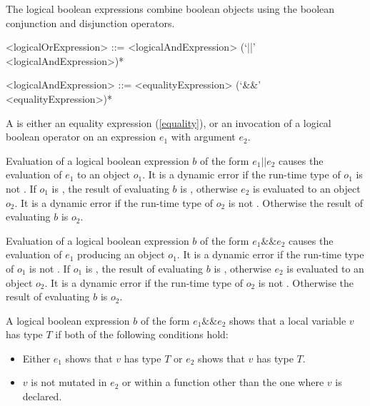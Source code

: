 \documentclass[makeidx]{article}
\begin{document}
{\LMHash{}%
The logical boolean expressions combine boolean objects using
the boolean conjunction and disjunction operators.

\begin{grammar}
<logicalOrExpression> ::= \gnewline{}
  <logicalAndExpression> (`||' <logicalAndExpression>)*

<logicalAndExpression> ::= <equalityExpression> (`\&\&' <equalityExpression>)*
\end{grammar}

\LMHash{}%
A  is either an equality expression
(\ref{equality}),
or an invocation of a logical boolean operator on
an expression $e_1$ with argument $e_2$.

\LMHash{}%
Evaluation of a logical boolean expression $b$ of the form $e_1 || e_2$ causes
the evaluation of $e_1$ to an object $o_1$.
It is a dynamic error if the run-time type of $o_1$ is not .
If $o_1$ is \TRUE, the result of evaluating $b$ is \TRUE,
otherwise $e_2$ is evaluated to an object $o_2$.
It is a dynamic error if the run-time type of $o_2$ is not .
Otherwise the result of evaluating $b$ is $o_2$.

\LMHash{}%
Evaluation of a logical boolean expression $b$ of the form $e_1 \&\& e_2$
causes the evaluation of $e_1$ producing an object $o_1$.
It is a dynamic error if the run-time type of $o_1$ is not .
If $o_1$ is \FALSE, the result of evaluating $b$ is \FALSE,
otherwise $e_2$ is evaluated to an object $o_2$.
It is a dynamic error if the run-time type of $o_2$ is not .
Otherwise the result of evaluating $b$ is $o_2$.

\LMHash{}%
A logical boolean expression $b$ of the form $e_1 \&\& e_2$
shows that a local variable $v$ has type $T$
if both of the following conditions hold:
\begin{itemize}
\item Either $e_1$ shows that $v$ has type $T$
  or $e_2$ shows that $v$ has type $T$.
\item $v$ is not mutated in $e_2$ or within a function
  other than the one where $v$ is declared.
\end{itemize}

}
\end{document}

